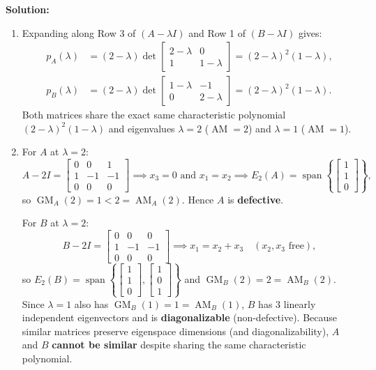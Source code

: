 \documentclass[11pt, letterpaper]{article}
\theoremstyle{definition}
\theoremstyle{remark}
\begin{document}
\textbf{Solution:}
\begin{enumerate}[label=(\alph*), topsep=3pt, itemsep=4pt]
    \item Expanding along Row 3 of $(A - \lambda I)$ and Row 1 of $(B - \lambda I)$ gives:
    \begin{align*}
    p_A(\lambda) &= (2 - \lambda)\det\begin{bmatrix} 2 - \lambda & 0 \\ 1 & 1 - \lambda \end{bmatrix} = (2 - \lambda)^2(1 - \lambda), \\
    p_B(\lambda) &= (2 - \lambda)\det\begin{bmatrix} 1 - \lambda & -1 \\ 0 & 2 - \lambda \end{bmatrix} = (2 - \lambda)^2(1 - \lambda).
    \end{align*}
    Both matrices share the exact same characteristic polynomial $(2 - \lambda)^2(1 - \lambda)$ and eigenvalues $\lambda = 2$ ($\operatorname{AM} = 2$) and $\lambda = 1$ ($\operatorname{AM} = 1$).
    \item For $A$ at $\lambda = 2$:
    \[
    A - 2I = \begin{bmatrix} 0 & 0 & 1 \\ 1 & -1 & -1 \\ 0 & 0 & 0 \end{bmatrix} \implies x_3 = 0 \text{ and } x_1 = x_2 \implies E_2(A) = \operatorname{span}\left\{\begin{bmatrix} 1 \\ 1 \\ 0 \end{bmatrix}\right\},
    \]
    so $\operatorname{GM}_A(2) = 1 < 2 = \operatorname{AM}_A(2)$. Hence $A$ is \textbf{defective}.

    For $B$ at $\lambda = 2$:
    \[
    B - 2I = \begin{bmatrix} 0 & 0 & 0 \\ 1 & -1 & -1 \\ 0 & 0 & 0 \end{bmatrix} \implies x_1 = x_2 + x_3 \quad (x_2, x_3 \text{ free}),
    \]
    so $E_2(B) = \operatorname{span}\left\{\begin{bmatrix} 1 \\ 1 \\ 0 \end{bmatrix}, \begin{bmatrix} 1 \\ 0 \\ 1 \end{bmatrix}\right\}$ and $\operatorname{GM}_B(2) = 2 = \operatorname{AM}_B(2)$. Since $\lambda = 1$ also has $\operatorname{GM}_B(1) = 1 = \operatorname{AM}_B(1)$, $B$ has $3$ linearly independent eigenvectors and is \textbf{diagonalizable} (non-defective).
    Because similar matrices preserve eigenspace dimensions (and diagonalizability), $A$ and $B$ \textbf{cannot be similar} despite sharing the same characteristic polynomial.
\end{enumerate}
\end{document}
